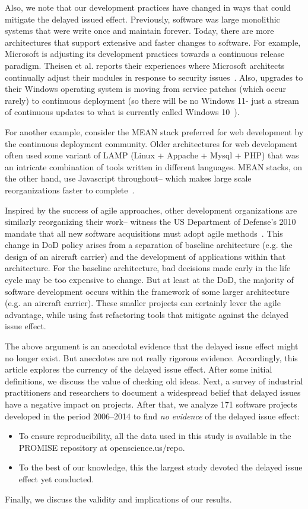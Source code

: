 \documentclass{sig-alternate}
\newcommand{\bi}{\begin{itemize}}%
\newcommand{\ei}{\end{itemize}}
\begin{document}
Also, we note that our development practices have changed in ways that could   mitigate the delayed issued effect.  Previously,
software was large monolithic systems that were write once and maintain
forever. Today, there are more architectures that
support  extensive and faster changes to software. 
For example, 
Microsoft is adjusting its development practices towards a continuous
release paradigm. Theisen et al. reports their experiences where Microsoft architects
continually adjust  their modules in response to security issues~\cite{Theisen15}.
Also, upgrades to their Windows operating system is moving from service patches (which occur rarely) to continuous deployment (so there will be no Windows 11- just a stream of continuous updates to what is currently called Windows 10~\cite{bright15}).

For another example, consider the MEAN stack preferred for web development by
the continuous deployment community. Older architectures for web development
often used some variant of LAMP (Linux + Appache + Mysql + PHP) that was an intricate
combination of tools written in different languages. MEAN stacks, on the other hand,
use Javascript throughout-- which makes large scale reorganizations faster to complete~\cite{wayner15}. 

Inspired by the success of agile approaches, other  development organizations are similarly reorganizing their work-- witness the US Department of Defense's 2010 mandate
that all new software acquisitions must adopt agile methods~\cite{kim13}. 
This change in DoD policy arises from a separation of baseline architecture
(e.g. the design of an 
aircraft carrier) and the development of applications within that architecture.
For the baseline architecture, bad decisions
made  early in the life cycle may be too expensive to change.
But at least at the DoD, the majority of software development occurs within
the framework of some larger architecture (e.g. an aircraft carrier).
These smaller projects can certainly lever the agile advantage, while 
using fast refactoring tools that mitigate against  the delayed issue effect.

The above argument is an anecdotal evidence that  the delayed issue effect might no longer exist. But anecdotes are not really rigorous
evidence. Accordingly,  this article explores the currency of the delayed issue effect.
After some initial definitions, we discuss the
value of checking old ideas. Next, a survey of industrial practitioners and researchers to document a widespread belief that delayed issues have a negative impact on projects.  After that, we  analyze 171 software  projects developed in the period 2006--2014 to find  {\em no evidence} of the delayed issue effect:
\bi
\item
To ensure reproducibility,
all the data  used in this study is available in the PROMISE
repository at openscience.us/repo. 
\item
To the best of our knowledge,
this the largest study devoted the delayed issue effect yet conducted.
\ei
Finally, we discuss the validity and implications of our results.
 
\end{document}
